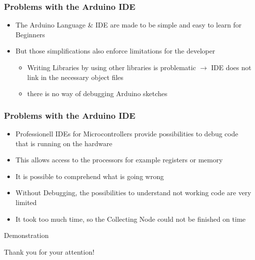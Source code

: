 \documentclass{beamer}
\begin{document}
\frame
{
	\frametitle{Problems with the Arduino IDE}
	\begin{itemize}
	\item The Arduino Language \& IDE are made to be simple and easy to learn for Beginners
	\item But those simplifications also enforce limitations for the developer
	\begin{itemize}
	\item Writing Libraries by using other libraries is problematic $\rightarrow$ IDE does not link in the necessary object files
	\item there is no way of debugging Arduino sketches
	\end{itemize}
	\end{itemize}
}

\frame
{
	\frametitle{Problems with the Arduino IDE}
	\begin{itemize}
	\item Professionell IDEs for Microcontrollers provide possibilities to debug code that is running on the hardware
	\item This allows access to the processors for example registers or memory 
	\item It is possible to comprehend what is going wrong
	\item Without Debugging, the possibilities to understand not working code are very limited
	\item It took too much time, so the Collecting Node could not be finished on time
	\end{itemize}
}

\frame
{
	\begin{center}
	Demonstration
	\end{center}

}



\frame
{
	\begin{center}
	Thank you for your attention!
	\end{center}
}
\end{document}
